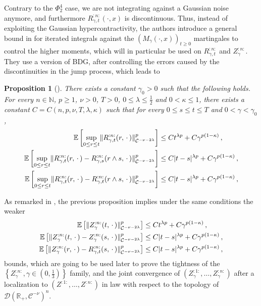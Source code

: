 \documentclass{report}
\newcommand{\NN}{\mathbb{N}}
\newcommand{\RR}{\mathbb{R}}
\DeclarePairedDelimiter\abs{\lvert}{\rvert} %
\DeclarePairedDelimiter\norm{\lVert}{\rVert}%
\newcommand{\Exp}[1]{\mathbb{E}\left[#1\right]}
\newcommand{\Placeholder}{\,\mathrel{\cdot}\,}
\newtheorem{proposition}[theorem]{Proposition}
\theoremstyle{remark}
\theoremstyle{definition}
\begin{document}
Contrary to the $\Phi^4_2$ case, we are not integrating against a Gaussian noise anymore, and furthermore $R^{:n:}_{\gamma, t}(\cdot, x)$ is discontinuous. Thus, instead of exploiting the Gaussian hypercontractivity, the authors introduce a general bound in \cite[Lemma 4.1.]{mourrat2015convergencetwodimensionaldynamicisingkac} for iterated integrals against the $(M_\gamma(\cdot, x))_{t \ge 0}$ martingales to control the higher moments, which will in particular be used on $R^{:n:}_{\gamma, t}$ and $Z^{:n:}_\gamma$. They use a version of BDG, after controlling the errors caused by the discontinuities in the jump process, which leads to
\begin{proposition}[{\cite[Proposition 4.2.]{mourrat2015convergencetwodimensionaldynamicisingkac}}]
  \label{prop:bounds_proposition_4.2}
  There exists a constant $\gamma_0 > 0$ such that the following holds. For every $n \in \NN$, $p \ge 1$, $\nu > 0$, $T > 0$, $0\le \lambda \le \frac{1}{2}$ and $0 < \kappa \le 1$, there exists a constant $C = C(n, p, \nu, T, \lambda, \kappa)$ such that for every $0 \le s \le t \le T$ and $0 < \gamma < \gamma_0$,
  \begin{align*}
    \Exp{\sup_{0\le r \le t} \norm{R^{:n:}_{\gamma, t}(r, \Placeholder)}^p_{\mathcal{C}^{-\nu-2\lambda}}} &\le C t^{\lambda p} + C \gamma^{p(1-\kappa)}\,,\\
    \Exp{\sup_{0\le r \le t} \norm{R^{:n:}_{\gamma, t}(r, \Placeholder) - R^{:n:}_{\gamma, s}(r \land s, \Placeholder)}^p_{\mathcal{C}^{-\nu-2\lambda}}} &\le C \abs{t -s}^{\lambda p} + C \gamma^{p(1-\kappa)}\,,\\
    \Exp{\sup_{0\le r \le t} \norm{R^{:n:}_{\gamma, t}(r, \Placeholder) - R^{:n:}_{\gamma, t}(r \land s, \Placeholder)}^p_{\mathcal{C}^{-\nu-2\lambda}}} &\le C \abs{t -s}^{\lambda p} + C \gamma^{p(1-\kappa)}\,,
  \end{align*}
\end{proposition}
As remarked in \cite[Remark 4.3.]{mourrat2015convergencetwodimensionaldynamicisingkac}, the previous proposition implies under the same conditions the weaker
\begin{align*}
      \Exp{ \norm{Z^{:n:}_{\gamma}(t, \Placeholder)}^p_{\mathcal{C}^{-\nu-2\lambda}}} &\le C t^{\lambda p} + C \gamma^{p(1-\kappa)}\,,\\
    \Exp{\norm{Z^{:n:}_{\gamma}(t, \Placeholder) - Z^{:n:}_{\gamma}(s, \Placeholder)}^p_{\mathcal{C}^{-\nu-2\lambda}}} &\le C \abs{t -s}^{\lambda p} + C \gamma^{p(1-\kappa)}\,,\\
    \Exp{\norm{Z^{:n:}_{\gamma}(r, \Placeholder) - R^{:n:}_{\gamma, t}(s, \Placeholder)}^p_{\mathcal{C}^{-\nu-2\lambda}}} &\le C \abs{t -s}^{\lambda p} + C \gamma^{p(1-\kappa)}\,,
\end{align*}
bounds, which are going to be used later to prove the tightness of the $\left\{Z^{:n:}_\gamma, \gamma \in (0, \frac{1}{3})\right\}$ family, and the joint convergence of $(Z^{:1:}_\gamma, \ldots, Z^{:n:}_\gamma)$ after a localization to $(Z^{:1:}, \ldots, Z^{:n:})$ in law with respect to the topology of $\mathcal{D}(\RR_+, \mathcal{C}^{-\nu})^n$.
\end{document}
